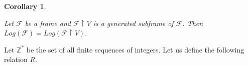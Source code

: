 \documentclass[a4paper]{article}
\theoremstyle{defin}
\theoremstyle{theorem}
\theoremstyle{prop}
\theoremstyle{lemma}
\theoremstyle{ex}
\theoremstyle{col}
\newtheorem{col}{Corollary}
\begin{document}
\begin{col}
  $ $

  Let $\mathcal{F}$ be a frame and $\mathcal{F} \restriction V$ is a generated subframe of $\mathcal{F}$.
  Then $Log(\mathcal{F}) = Log(\mathcal{F} \restriction V)$.
\end{col}

Let $\mathbb{Z}^{*}$ be the set of all finite sequences of integers. Let us define the following relation $R$.
\end{document}
